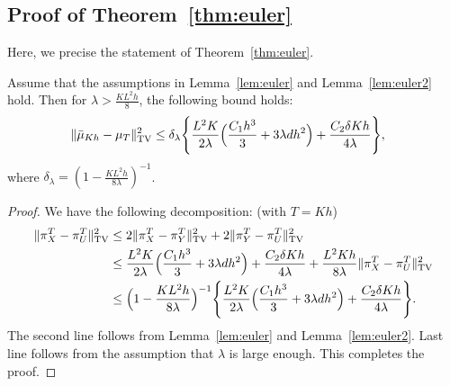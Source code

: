 \subsection{Proof of Theorem~\ref{thm:euler}}

Here, we precise the statement of Theorem~\ref{thm:euler}.

\begin{thm}
\label{lem:euler3}
Assume that the assumptions in Lemma~\ref{lem:euler} and Lemma~\ref{lem:euler2} hold. Then for $\lambda > \frac{KL^2h}{8}$, the following bound holds:
\begin{align}
\|\bar{\mu}_{Kh} - \mu_{T} \|_{\textnormal{TV}}^2 &\leq \delta_\lambda \Biggl\{ \frac{L^2 K}{2\lambda} \Bigl( \frac{C_1 h^3}{3} + 3 \lambda d h^2 \Bigr) + \frac{C_2 \delta K h}{4\lambda} \Biggr\},
\end{align}
where $\delta_\lambda = (1 -\frac{KL^2h}{8\lambda})^{-1} $.
\end{thm}
%
\begin{proof}
We have the following decomposition: (with $T= Kh$)
\begin{align}
\|\pi_{X}^T - \pi_{U}^T \|_{\textnormal{TV}}^2 &\leq 2 \|\pi_{X}^T - \pi_Y^T \|_{\textnormal{TV}}^2 + 2\|\pi_Y^T - \pi_{U}^T \|_{\textnormal{TV}}^2 \\
&\leq  \frac{L^2 K}{2\lambda} \Bigl( \frac{C_1 h^3}{3} + 3 \lambda d h^2 \Bigr) + \frac{C_2 \delta K h}{4\lambda} +  \frac{L^2 K h}{8 \lambda}  \|\pi_X^T - \pi_{U}^T \|_{\textnormal{TV}}^2 \\ 
&\leq \Bigl(1 -\frac{KL^2h}{8\lambda} \Bigr)^{-1} \Biggl\{ \frac{L^2 K}{2\lambda} \Bigl( \frac{C_1 h^3}{3} + 3 \lambda d h^2 \Bigr) + \frac{C_2 \delta K h}{4\lambda} \Biggr\}.
\end{align}
The second line follows from Lemma~\ref{lem:euler} and Lemma~\ref{lem:euler2}. Last line follows from the assumption that $\lambda$ is large enough. This completes the proof.
\end{proof}


